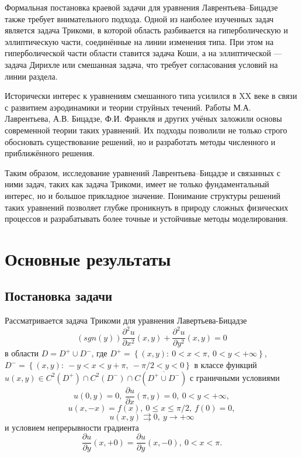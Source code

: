 \documentclass[12pt, a4paper]{article}
\begin{document}
Формальная постановка краевой задачи для уравнения Лаврентьева–Бицадзе также требует внимательного подхода. Одной из наиболее изученных задач является задача Трикоми, в которой область разбивается на гиперболическую и эллиптическую части, соединённые на линии изменения типа. При этом на гиперболической части области ставится задача Коши, а на эллиптической — задача Дирихле или смешанная задача, что требует согласования условий на линии раздела.

Исторически интерес к уравнениям смешанного типа усилился в XX веке в связи с развитием аэродинамики и теории струйных течений. Работы М.А. Лаврентьева, А.В. Бицадзе, Ф.И. Франкля и других учёных заложили основы современной теории таких уравнений. Их подходы позволили не только строго обосновать существование решений, но и разработать методы численного и приближённого решения.

Таким образом, исследование уравнений Лаврентьева–Бицадзе и связанных с ними задач, таких как задача Трикоми, имеет не только фундаментальный интерес, но и большое прикладное значение. Понимание структуры решений таких уравнений позволяет глубже проникнуть в природу сложных физических процессов и разрабатывать более точные и устойчивые методы моделирования.
\section{Основные результаты}
\subsection{Постановка задачи}
	Рассматривается задача Трикоми для уравнения Лавертьева-Бицадзе
\begin{equation}
	\left(sgn (y)\right) \dfrac{\partial^2 u}{\partial x^2}(x,y) + \dfrac{\partial^2 u}{\partial y^2}(x,y) = 0
\end{equation}
в области $D = D^{+} \cup D^{-}$, где $D^{+} = \left\{(x,y): \ 0 < x < \pi, \ 0 < y < + \infty \right\}$, \newline
$D^{-} = \left\{(x,y): \ -y < x < y + \pi, \ -\pi/2 < y < 0\right\}$ в классе функций $u(x,y) \in C^2(D^{+}) \cap C^2(D^{-}) \cap C(\overline{D^{+} \cup D^{-}})$ с граничными условиями
\begin{equation}
	u(0,y) = 0, \ \dfrac{\partial u}{\partial x}(\pi, y) = 0, \ 0 < y < + \infty,
\end{equation}
\begin{equation}
	u(x,-x) = f(x) , \ 0 \leq x \leq \pi/2, \ f(0) = 0, 
\end{equation}
\begin{equation}
	u(x,y) \rightrightarrows 0, \ y \to +\infty
\end{equation}
и условием непрерывности градиента
\begin{equation}
 \dfrac{\partial u}{\partial y}(x, +0) = \dfrac{\partial u}{\partial y} (x, -0), \ 0 < x < \pi.
\end{equation}
\end{document}
